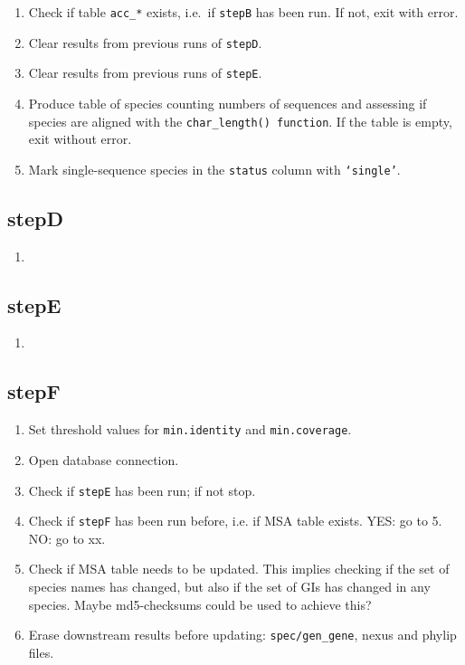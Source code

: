 \documentclass[12pt]{article}
\begin{document}
\begin{enumerate}
\item Check if table \texttt{acc\_*} exists, i.e.~if \texttt{stepB} has been run. If not, exit with error.
\item Clear results from previous runs of \texttt{stepD}.
\item Clear results from previous runs of \texttt{stepE}.


\item Produce table of species counting numbers of sequences and assessing if species are aligned with the \texttt{char\_length() function}. If the table is empty, exit without error.

\item Mark single-sequence species in the \texttt{status} column with \texttt{`single'}.

\end{enumerate}

\subsection{stepD}

\begin{enumerate}
\item 
\end{enumerate}

\subsection{stepE}

\begin{enumerate}
\item 
\end{enumerate}



\subsection{stepF}

\begin{enumerate}
\item Set threshold values for \texttt{min.identity} and \texttt{min.coverage}.
\item Open database connection.
\item Check if \texttt{stepE} has been run; if not stop.
\item Check if \texttt{stepF} has been run before, i.e. if MSA table exists. YES: go to 5. NO: go to xx.
\item Check if MSA table needs to be updated. This implies checking if the set of species names has changed, but also if the set of GIs has changed in any species. Maybe md5-checksums could be used to achieve this?
\item Erase downstream results before updating: \texttt{spec/gen\_gene}, nexus and phylip files.
\end{enumerate}
\end{document}
